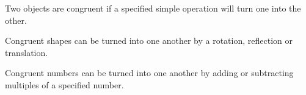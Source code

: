 Two objects are congruent if a specified simple operation will turn one into the other.
\par
Congruent shapes can be turned into one another by a rotation, reflection or 
translation.
\par
Congruent numbers can be turned into one another by adding or subtracting
multiples of a specified number.